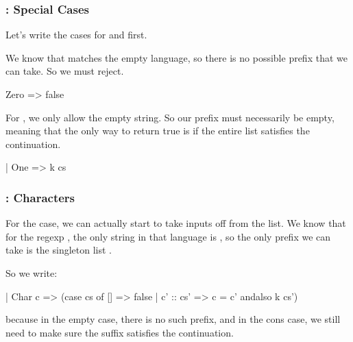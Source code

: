 \documentclass[aspectratio=169]{beamer}
\begin{document}
\begin{frame}[fragile]
  \frametitle{: Special Cases}

  Let's write the cases for  and  first.

  \pause
  \vspace{\fill}

  We know that  matches the empty language, so there is no possible
  prefix that we can take. So we must reject.

  \begin{codeblock}
    Zero => false
  \end{codeblock}

  \pause
  \vspace{\fill}

  For , we only allow the empty string. So our prefix must necessarily
  be empty, meaning that the only way to return true is if the entire list satisfies
  the continuation.

  \begin{codeblock}
    | One => k cs
  \end{codeblock}
\end{frame}

\begin{frame}[fragile]
  \frametitle{: Characters}

  For the  case, we can actually start to take inputs
  off from the list. We know that for the regexp , the only
  string in that language is , so the only prefix we can take is
  the singleton list .

  \pause
  \vspace{\fill}

  So we write:

  \begin{codeblock}
    | Char c => (case cs of
        [] => false
      | c' :: cs' => c = c' andalso k cs')
  \end{codeblock}

  because in the empty case, there is no such prefix, and in the cons case,
  we still need to make sure the suffix satisfies the continuation.
\end{frame}
\end{document}
